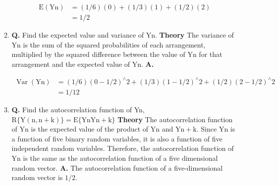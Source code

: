 \documentclass[main.tex]{subfiles}
\begin{document}
\begin{enumerate}
\begin{enumerate}
        $$
        \begin{aligned}
        \mathrm{E}(\mathrm{Yn}) & = (1/6)(0) + (1/3)(1) + (1/2)(2) \\
        & = 1/2
        \end{aligned}
        $$  
        
        \item \textbf{Q.} Find the expected value and variance of $\mathrm{Yn}$. \textbf{Theory} The variance of $\mathrm{Yn}$ is the sum of the squared probabilities of each arrangement, multiplied by the squared difference between the value of $\mathrm{Yn}$ for that arrangement and the expected value of $\mathrm{Yn}$. \textbf{A.}
         
        $$
        \begin{aligned}
        \operatorname{Var}(\mathrm{Yn}) &= (1/6)(0-1/2)^{\wedge} 2 + (1/3)(1- 1/2)^{\wedge} 2 + (1 / 2)(2-1 / 2)^{\wedge}2 \\ 
        & = 1/12
        \end{aligned}
        $$
        
        \item \textbf{Q.} Find the autocorrelation function of Yn, $\mathrm{R}\{\mathrm{Y}(\mathrm{n}, \mathrm{n}+\mathrm{k})\}=\mathrm{E}\{\mathrm{Yn} \mathrm{Yn}+\mathrm{k}\}$ \textbf{Theory} The autocorrelation function of $\mathrm{Yn}$ is the expected value of the product of $\mathrm{Yn}$ and $\mathrm{Yn+k}$. Since $\mathrm{Yn}$ is a function of five binary random variables, it is also a function of five independent random variables. Therefore, the autocorrelation function of $\mathrm{Yn}$ is the same as the autocorrelation function of a five dimensional random vector. \textbf{A.} The autocorrelation function of a five-dimensional random vector is $1 / 2$.
        
    \end{enumerate}
    
\end{enumerate}
\end{document}
